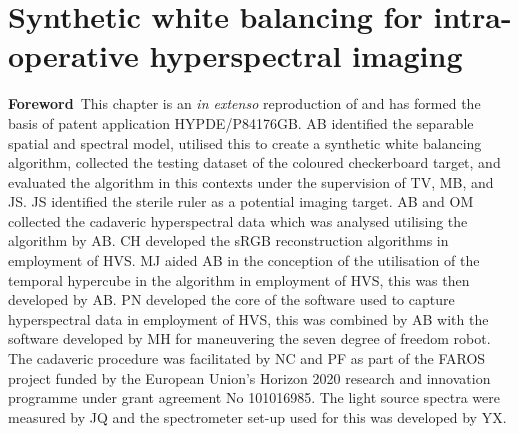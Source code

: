 % 
\chapter[Synthetic white balancing]{Synthetic white balancing for intra-operative hyperspectral imaging}
\label{chap:SWB}

\begin{center}
\begin{minipage}[b]{0.9\linewidth}
\small
\textbf{Foreword\,}
This chapter is an \emph{in extenso} reproduction of \cite{Bahl2023} and has formed the basis of patent application HYPDE/P84176GB. 
\newline
AB identified the separable spatial and spectral model, utilised this to create a synthetic white balancing algorithm, collected the testing dataset of the coloured checkerboard target, and evaluated the algorithm in this contexts under the supervision of TV, MB, and JS. JS identified the sterile ruler as a potential imaging target. AB and OM collected the cadaveric hyperspectral data which was analysed utilising the algorithm by AB. CH developed the sRGB reconstruction algorithms in employment of HVS. MJ aided AB in the conception of the utilisation of the temporal hypercube in the algorithm in employment of HVS, this was then developed by AB. PN developed the core of the software used to capture hyperspectral data in employment of HVS, this was combined by AB with the software developed by MH for maneuvering the seven degree of freedom robot. The cadaveric procedure was facilitated by NC and PF as part of the FAROS project funded by the European Union’s Horizon 2020 research and innovation programme under grant agreement No 101016985. The light source spectra were measured by JQ and the spectrometer set-up used for this was developed by YX. 
\end{minipage}
\end{center}



